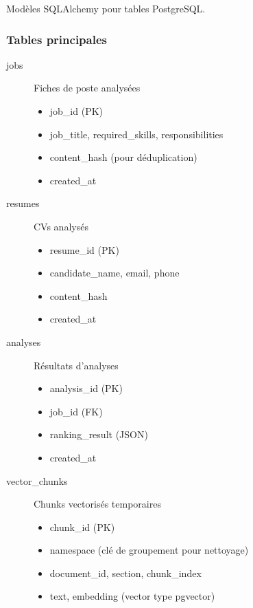 \documentclass[12pt,a4paper,oneside]{book}
\begin{document}
Modèles SQLAlchemy pour tables PostgreSQL.

\subsubsection{Tables principales}

\begin{description}
    \item[jobs] Fiches de poste analysées
    \begin{itemize}
        \item job\_id (PK)
        \item job\_title, required\_skills, responsibilities
        \item content\_hash (pour déduplication)
        \item created\_at
    \end{itemize}
    
    \item[resumes] CVs analysés
    \begin{itemize}
        \item resume\_id (PK)
        \item candidate\_name, email, phone
        \item content\_hash
        \item created\_at
    \end{itemize}
    
    \item[analyses] Résultats d'analyses
    \begin{itemize}
        \item analysis\_id (PK)
        \item job\_id (FK)
        \item ranking\_result (JSON)
        \item created\_at
    \end{itemize}
    
    \item[vector\_chunks] Chunks vectorisés temporaires
    \begin{itemize}
        \item chunk\_id (PK)
        \item namespace (clé de groupement pour nettoyage)
        \item document\_id, section, chunk\_index
        \item text, embedding (vector type pgvector)
    \end{itemize}
\end{description}
\end{document}
